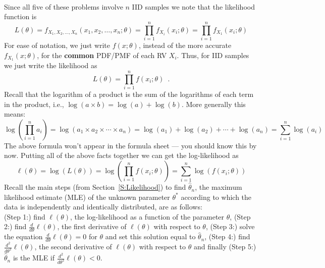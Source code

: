 \begin{Answer}
~\\
Since all five of these problems involve $n$ IID samples we note that the likelihood function is
\[
L(\theta) = f_{X_1,X_2,\ldots,X_n}(x_1,x_2,\ldots,x_n; \theta)
= \prod_{i=1}^n f_{X_i}(x_i;\theta) = \prod_{i=1}^n f_{X_1}(x_i;\theta)
\]
For ease of notation, we just write $f(x;\theta)$, instead of the more accurate $f_{X_1}(x;\theta)$, for the {\bf common} PDF/PMF of each RV $X_i$.  Thus, for IID samples we just write the likelihood as
\[
L(\theta) = \prod_{i=1}^n f(x_i;\theta) \enspace.
\] 
Recall that the logarithm of a product is the sum of the logarithms of each term in the product, i.e., $\log(a \times b) = \log(a)+\log(b)$.  
More generally this means: 
$$\log\left(\prod_{i=1}^n a_i\right) = \log\left( a_1 \times a_2 \times \cdots \times a_n\right) = \log(a_1)+\log(a_2)+\cdots+\log(a_n)=\sum_{i=1}^n \log(a_i)$$
The above formula won't appear in the formula sheet --- you should know this by now.
Putting all of the above facts together we can get the log-likelihood as
\[
\ell(\theta) = \log \left( L(\theta) \right) = \log \left( \prod_{i=1}^n f(x_i;\theta) \right) 
= \sum_{i=1}^n \log\left(f(x_i;\theta)\right)
\] 
Recall the main steps (from Section~\ref{S:Likelihood}) to find $\widehat{\theta}_n$, the maximum likelihood estimate (MLE) of the unknown parameter $\theta^*$ according to which the data is independently and identically distributed, are as follows:\\ 
({\sf Step 1:}) find $\ell(\theta)$, the log-likelihood as a function of the parameter $\theta$, 
({\sf Step 2:}) find $\frac{d}{d \theta} \ell(\theta)$, the first derivative of $\ell(\theta)$ with respect to $\theta$, 
({\sf Step 3:}) solve the equation $\frac{d}{d \theta} \ell(\theta)=0$ for $\theta$ and set this solution equal to $\widehat{\theta}_n$, 
({\sf Step 4:}) find $\frac{d^2}{d \theta^2} \ell(\theta)$, the second derivative of $\ell(\theta)$ with respect to $\theta$ and finally 
({\sf Step 5:}) $\widehat{\theta}_n$ is the MLE if $\frac{d^2}{d \theta^2} \ell(\theta) < 0$.


\end{Answer}
